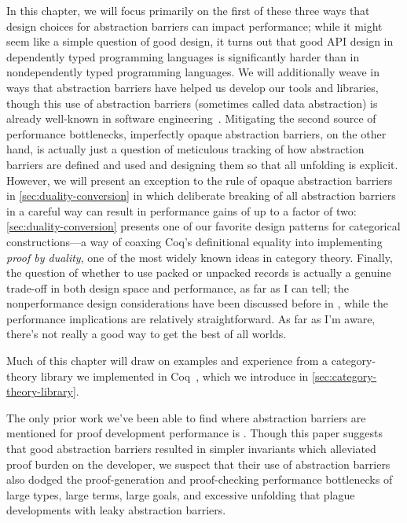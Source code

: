 In this chapter, we will focus primarily on the first of these three ways that design choices for abstraction barriers can impact performance; while it might seem like a simple question of good design, it turns out that good API design in dependently typed programming languages is significantly harder than in nondependently typed programming languages.
We will additionally weave in ways that abstraction barriers have helped us develop our tools and libraries, though this use of abstraction barriers (sometimes called data abstraction) is already well-known in software engineering~\cite{Structure1996Sussman}.
Mitigating the second source of performance bottlenecks, imperfectly opaque abstraction barriers, on the other hand, is actually just a question of meticulous tracking of how abstraction barriers are defined and used and designing them so that all unfolding is explicit.
However, we will present an exception to the rule of opaque abstraction barriers in \autoref{sec:duality-conversion} in which deliberate breaking of all abstraction barriers in a careful way can result in performance gains of up to a factor of two:
\autoref{sec:duality-conversion} presents one of our favorite design patterns for categorical constructions---a way of coaxing Coq's definitional equality into implementing \emph{proof by duality}, one of the most widely known ideas in category theory.
Finally, the question of whether to use packed or unpacked records is actually a genuine trade-off in both design space and performance, as far as I can tell;
the nonperformance design considerations have been discussed before in \textcite{Packaging2009Garillot}, while the performance implications are relatively straightforward.
As far as I'm aware, there's not really a good way to get the best of all worlds.

Much of this chapter will draw on examples and experience from a category-theory library we implemented in Coq~\cite{category-coq-experience}, which we introduce in \autoref{sec:category-theory-library}.

The only prior work we've been able to find where abstraction barriers are mentioned for proof development performance is \textcite{Deep2015Gu}.
Though this paper suggests that good abstraction barriers resulted in simpler invariants which alleviated proof burden on the developer, we suspect that their use of abstraction barriers also dodged the proof-generation and proof-checking performance bottlenecks of large types, large terms, large goals, and excessive unfolding that plague developments with leaky abstraction barriers.

